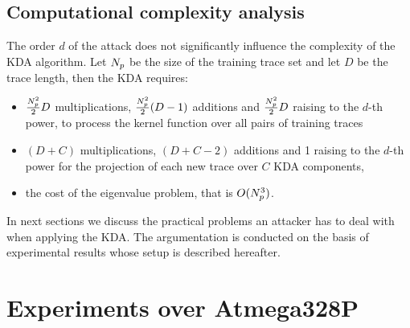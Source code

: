 \subsection{Computational complexity analysis}
The order $d$ of the attack does not significantly influence the complexity of the KDA algorithm. Let $N_p$ be the size of the training trace set and let $D$ be the trace length, then the KDA requires:
\begin{itemize}
\item $\frac{N_p^2}{2}D$ multiplications, $\frac{N_p^2}{2}(D-1)$ additions and $\frac{N_p^2}{2}D$ raising to the $d$-th power, to process the kernel function over all pairs of training traces
\item $(D+C)$ multiplications, $(D+C-2)$ additions and 1 raising to the $d$-th power for the projection of each new trace over $C$ KDA components,
\item the cost of the eigenvalue problem, that is $O(N_p^3)$.
\end{itemize} 

In next sections we discuss the practical problems an attacker has to deal with when applying the KDA. The argumentation is conducted on the basis of experimental results whose setup is described hereafter.

\section{Experiments over Atmega328P}\label{sec:practice}
